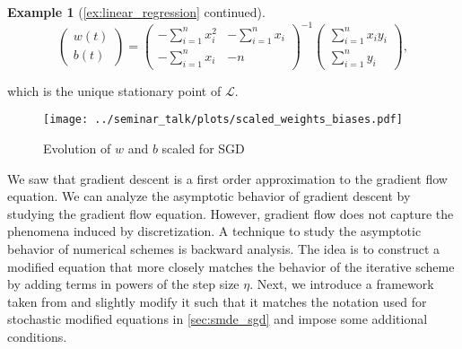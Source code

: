 \documentclass[12pt]{article}
\theoremstyle{definition}
\newtheorem{example}[example]{Example}
\numberwithin{equation}{section}
\newcommand{\CL}{\mathcal{L}}
\begin{document}
\begin{example}[\autoref{ex:linear_regression} continued]
\begin{equation*}
    \begin{pmatrix}
      w(t) \\
      b(t)
    \end{pmatrix}
    = 
    \begin{pmatrix}
      -  \displaystyle\sum_{i=1}^n x_i^2  &  -  \displaystyle\sum_{i=1}^n x_i      \\
        -  \displaystyle\sum_{i=1}^n x_i  &  -n      
    \end{pmatrix}^{-1}
    \begin{pmatrix}
        \displaystyle\sum_{i=1}^n x_i y_i     \\
        \displaystyle\sum_{i=1}^n y_i    
    \end{pmatrix},
  \end{equation*}
  
  which is the unique stationary point of $\CL$.
  \begin{figure}[htb]
    \centering
    \texttt{[image: ../seminar\_talk/plots/scaled\_weights\_biases.pdf]}
    \caption{Evolution of $w$ and $b$ scaled for SGD}
    \label{fig:scaled_weights_biases}
  \end{figure}
\end{example}
We saw that gradient descent is a first order approximation to the gradient flow equation. We can analyze the asymptotic behavior of gradient descent by studying the gradient flow equation. However, gradient flow does not capture the phenomena induced by discretization. 
A technique to study the asymptotic behavior of numerical schemes is backward analysis. The idea is to construct a modified equation that more closely matches the behavior of the iterative scheme by adding terms in powers of the step size $\eta$.
Next, we introduce a framework taken from \cite{hairerGeometricNumericalIntegration2013} and slightly modify it such that it matches the notation used for stochastic modified equations in \autoref{sec:smde_sgd} and impose some additional conditions.
\end{document}
